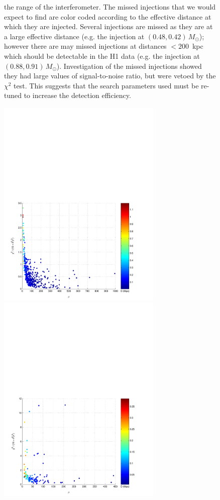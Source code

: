 \begin{figure}[p]
{the range of the interferometer. The missed injections that we would expect to
find are color coded according to the effective distance at which they are
injected.  Several injections are missed as they are at a large effective
distance (e.g.  the injection at $(0.48,0.42)\,M_\odot$); however there are
may missed injections at distances $< 200$~kpc which should be detectable in
the H1 data (e.g. the injection at $(0.88,0.91)\,M_\odot$). Investigation of
the missed injections showed they had large values of signal-to-noise ratio,
but were vetoed by the $\chi^2$ test. This suggests that the search parameters
used must be re-tuned to increase the detection efficiency.
}
\end{figure}

\begin{figure}[p]
\begin{center}
\includegraphics[width=0.7\textwidth]{figures/result/l1_inj_snr_7_0_delta_0_04_chisq_5_0}\\
\includegraphics[width=0.7\textwidth]{figures/result/h1_inj_snr_7_0_delta_0_04_chisq_12_5}

\end{center}
\end{figure}

